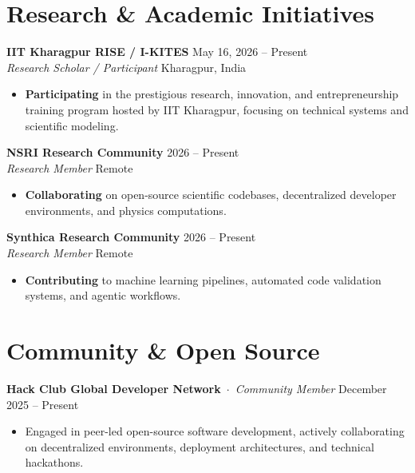 \documentclass[10pt,letterpaper]{article}
\begin{document}
\section{Research \& Academic Initiatives}
\noindent
\textbf{IIT Kharagpur RISE / I-KITES} \hfill May 16, 2026 -- Present \\
\textit{Research Scholar / Participant} \hfill Kharagpur, India
\begin{itemize}
    \item \textbf{Participating} in the prestigious research, innovation, and entrepreneurship training program hosted by IIT Kharagpur, focusing on technical systems and scientific modeling.
\end{itemize}

\vspace{6pt}
\noindent
\textbf{NSRI Research Community} \hfill 2026 -- Present \\
\textit{Research Member} \hfill Remote
\begin{itemize}
    \item \textbf{Collaborating} on open-source scientific codebases, decentralized developer environments, and physics computations.
\end{itemize}

\vspace{6pt}
\noindent
\textbf{Synthica Research Community} \hfill 2026 -- Present \\
\textit{Research Member} \hfill Remote
\begin{itemize}
    \item \textbf{Contributing} to machine learning pipelines, automated code validation systems, and agentic workflows.
\end{itemize}

\section{Community \& Open Source}
\noindent
\textbf{Hack Club Global Developer Network} \,$\cdot$\, \textit{Community Member} \hfill December 2025 -- Present
\begin{itemize}
    \item Engaged in peer-led open-source software development, actively collaborating on decentralized environments, deployment architectures, and technical hackathons.
\end{itemize}
\end{document}
